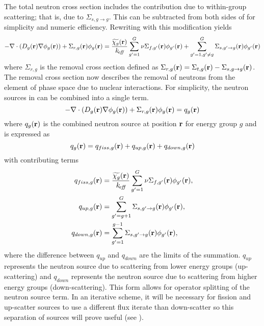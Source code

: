   The total neutron cross section includes the contribution due to within-group
  scattering; that is, due to $\Sigma_{s,g\rightarrow g}$. This can be
  subtracted from both sides of  for simplicity
  and numeric efficiency. Rewriting  with this
  modification yields
  \begin{equation} 
    \label{eq:multigroup_removal}
    - \mathbf{\nabla} \cdot( D_g(\mathbf{r}) \mathbf{\nabla} \phi_g(\mathbf{r})) + \Sigma_{r,g}(\mathbf{r}) \phi_g(\mathbf{r}) = 
      \frac{\widetilde{\chi_g}(\mathbf{r})}{k_{\!\mbox{\scriptsize \em eff}}} 
      \sum_{g'=1}^{G} \nu\Sigma_{f,g'}(\mathbf{r}) 
      \phi_{g'}(\mathbf{r}) + \sum_{g'=1, g' \ne g}^{G} 
      \Sigma_{s,g' \rightarrow g}(\mathbf{r}) \phi_{g'}(\mathbf{r})
  \end{equation}
  where $\Sigma_{r,g}$ is the removal cross section defined as
  $\Sigma_{r,g}(\mathbf{r}) = \Sigma_{t,g}(\mathbf{r}) - \Sigma_{s,g\rightarrow g}(\mathbf{r})$. The
  removal cross section now describes the removal of neutrons from the element
  of phase space due to nuclear interactions.  For simplicity, the neutron
  sources in  can be combined into a single term.
  \begin{equation}
    \label{eq:multigroup_source}
    - \mathbf{\nabla} \cdot( D_g(\mathbf{r}) \mathbf{\nabla} \phi_g(\mathbf{r})) + \Sigma_{r,g}(\mathbf{r}) \phi_g(\mathbf{r}) = 
      q_g(\mathbf{r})
  \end{equation}
  where $q_g(\mathbf{r})$ is the combined neutron source at position $\mathbf{r}$ for energy
  group $g$ and is expressed as
  \begin{equation}
    \label{eq:q}
    q_g(\mathbf{r}) = q_{fiss,g}(\mathbf{r}) + q_{up,g}(\mathbf{r}) + q_{down,g}(\mathbf{r}) 
  \end{equation}
  with contributing terms
  \begin{align}
    \label{eq:qfiss}
    q_{fiss,g}(\mathbf{r}) &= \frac{\widetilde{\chi_g}(\mathbf{r})}{k_{\!\mbox{\scriptsize \em eff}}} \sum_{g'=1}^{G} 
      \nu \Sigma_{f,g'}(\mathbf{r}) \phi_{g'}(\mathbf{r}), \\
    \label{eq:qup}
    q_{up,g}(\mathbf{r}) &= \sum_{g'=g+1}^{G} \Sigma_{s,g' \rightarrow g}(\mathbf{r})
      \phi_{g'}(\mathbf{r}), \\
    \label{eq:qdown}
    q_{down,g}(\mathbf{r}) &= \sum_{g'=1}^{g-1} \Sigma_{s,g' \rightarrow g}(\mathbf{r})
      \phi_{g'}(\mathbf{r}),
  \end{align}
  where the difference between $q_{up}$ and $q_{down}$ are the limits of the
  summation. $q_{up}$ represents the neutron source due to scattering from lower
  energy groups (up-scattering) and $q_{down}$ represents the neutron source due
  to scattering from higher energy groups (down-scattering). This form allows
  for operator splitting of the neutron source term. In an iterative scheme, it
  will be necessary for fission and up-scatter sources to use a different flux
  iterate than down-scatter so this separation of sources will prove useful (see
  ).

